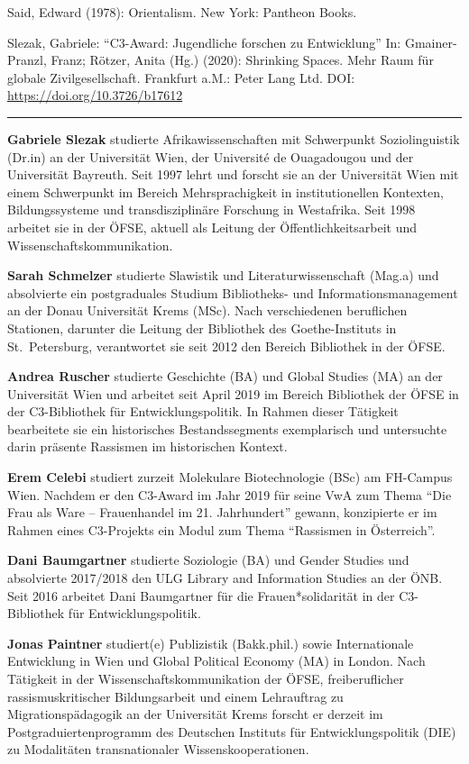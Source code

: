 \documentclass[a4paper,
fontsize=11pt,
oneside,
numbers=noperiodatend,
parskip=half-,
bibliography=totoc,
final
]{scrartcl}
\begin{document}
Said, Edward (1978): Orientalism. New York: Pantheon Books.

Slezak, Gabriele: \enquote{C3-Award: Jugendliche forschen zu
Entwicklung} In: Gmainer-Pranzl, Franz; Rötzer, Anita (Hg.) (2020):
Shrinking Spaces. Mehr Raum für globale Zivilgesellschaft. Frankfurt
a.M.: Peter Lang Ltd. DOI: \url{https://doi.org/10.3726/b17612}

\begin{center}\rule{0.5\linewidth}{0.5pt}\end{center}

\textbf{Gabriele Slezak} studierte Afrikawissenschaften mit Schwerpunkt
Soziolinguistik (Dr.in) an der Universität Wien, der Université de
Ouagadougou und der Universität Bayreuth. Seit 1997 lehrt und forscht
sie an der Universität Wien mit einem Schwerpunkt im Bereich
Mehrsprachigkeit in institutionellen Kontexten, Bildungssysteme und
transdisziplinäre Forschung in Westafrika. Seit 1998 arbeitet sie in der
ÖFSE, aktuell als Leitung der Öffentlichkeitsarbeit und
Wissenschaftskommunikation.

\textbf{Sarah Schmelzer} studierte Slawistik und Literaturwissenschaft
(Mag.a) und absolvierte ein postgraduales Studium Bibliotheks- und
Informationsmanagement an der Donau Universität Krems (MSc). Nach
verschiedenen beruflichen Stationen, darunter die Leitung der Bibliothek
des Goe\-the-Instituts in St.~Petersburg, verantwortet sie seit 2012 den
Bereich Bibliothek in der ÖFSE.

\textbf{Andrea Ruscher} studierte Geschichte (BA) und Global Studies
(MA) an der Universität Wien und arbeitet seit April 2019 im Bereich
Bibliothek der ÖFSE in der C3-Bibliothek für Entwicklungspolitik. In
Rahmen dieser Tätigkeit bearbeitete sie ein historisches
Bestandssegments exemplarisch und untersuchte darin präsente Rassismen
im historischen Kontext.

\textbf{Erem Celebi} studiert zurzeit Molekulare Biotechnologie (BSc) am
FH-Campus Wien. Nachdem er den C3-Award im Jahr 2019 für seine VwA zum
Thema \enquote{Die Frau als Ware -- Frauenhandel im 21. Jahrhundert} gewann,
konzipierte er im Rahmen eines C3-Projekts ein Modul zum Thema
\enquote{Rassismen in Österreich}.

\textbf{Dani Baumgartner} studierte Soziologie (BA) und Gender Studies
und absolvierte 2017/2018 den ULG Library and Information Studies an der
ÖNB. Seit 2016 arbeitet Dani Baumgartner für die Frauen*solidarität in
der C3-Bibliothek für Entwicklungspolitik.

\textbf{Jonas Paintner} studiert(e) Publizistik (Bakk.phil.) sowie
Internationale Entwicklung in Wien und Global Political Economy (MA) in
London. Nach Tätigkeit in der Wissenschaftskommunikation der ÖFSE,
freiberuflicher rassismuskritischer Bildungsarbeit und einem Lehrauftrag
zu Migrationspädagogik an der Universität Krems forscht er derzeit im
Postgraduiertenprogramm des Deutschen Instituts für Entwicklungspolitik
(DIE) zu Modalitäten transnationaler Wissenskooperationen.
\end{document}
